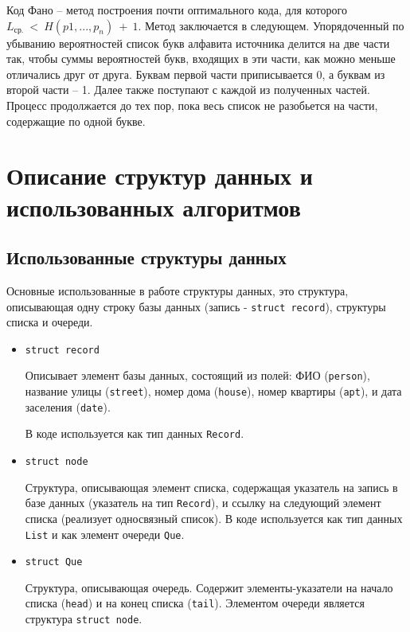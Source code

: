 \documentclass[fleqn]{article}
\begin{document}
Код Фано -- метод построения почти оптимального кода, для которого $L_{\text{ср.}}~<~H(p1,...,p_n)~+~1$.
Метод заключается в следующем.
Упорядоченный по убыванию вероятностей список букв алфавита источника делится на две
части так, чтобы суммы вероятностей букв, входящих в эти части, как можно
меньше отличались друг от друга. Буквам первой части приписывается 0, а
буквам из второй части – 1. Далее также поступают с каждой из полученных
частей. Процесс продолжается до тех пор, пока весь список не разобьется на
части, содержащие по одной букве.

\section{Описание структур данных и использованных алгоритмов}

\subsection{Использованные структуры данных}

Основные использованные в работе структуры данных,
это структура, описывающая одну строку базы данных
(запись - \verb+struct record+), структуры списка и очереди.

\begin{itemize}
	\item \verb+struct record+

		Описывает элемент базы данных,
		состоящий из полей: ФИО (\verb+person+),
		название улицы (\verb+street+),
		номер дома (\verb"house"),
		номер квартиры (\verb"apt"),
		и дата заселения (\verb"date").

		В коде используется как тип данных 
		\verb+Record+.

	\item \verb+struct node+

		Структура, описывающая элемент списка,
		содержащая указатель на запись в базе данных
		(указатель на тип \verb"Record"), и ссылку на
		следующий элемент списка (реализует односвязный
		список).
		В коде используется как тип данных 
		\verb+List+ и как элемент очереди \verb"Que".

	\item \verb+struct Que+

		Структура, описывающая очередь. Содержит
		элементы-указатели на начало списка
		(\verb"head") и на конец списка (\verb"tail").
		Элементом очереди является структура
		\verb"struct node".

\end{itemize}
\end{document}
